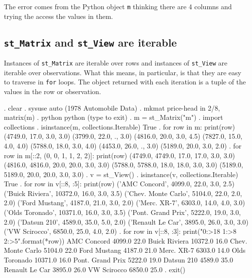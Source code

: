 \documentclass{article}
\begin{document}
The error comes from the Python object \texttt{m} thinking there are 4 columns and trying the access the values in them.



\subsection{\lstinline$st_Matrix$ and \lstinline$st_View$ are iterable} \label{iterable}

Instances of \lstinline{st_Matrix} are iterable over rows and instances of \lstinline{st_View} are iterable over observations. What this means, in particular, is that they are easy to traverse in \lstinline{for} loops. The object returned with each iteration is a tuple of the values in the row or observation.

\begin{stlog}
{\smallskip}
. clear
{\smallskip}
. sysuse auto
(1978 Automobile Data)
{\smallskip}
. mkmat price-head in 2/8, matrix(m)
{\smallskip}
. python
 python (type {} to exit) 
. m = st_Matrix("m")
{\smallskip}
. import collections
{\smallskip}
. isinstance(m, collections.Iterable)
True
{\smallskip}
. for row in m: print(row)
(4749.0, 17.0, 3.0, 3.0)
(3799.0, 22.0, ., 3.0)
(4816.0, 20.0, 3.0, 4.5)
(7827.0, 15.0, 4.0, 4.0)
(5788.0, 18.0, 3.0, 4.0)
(4453.0, 26.0, ., 3.0)
(5189.0, 20.0, 3.0, 2.0)
{\smallskip}
. for row in m[::2, (0, 0, 1, 1, 2, 2)]: print(row)
(4749.0, 4749.0, 17.0, 17.0, 3.0, 3.0)
(4816.0, 4816.0, 20.0, 20.0, 3.0, 3.0)
(5788.0, 5788.0, 18.0, 18.0, 3.0, 3.0)
(5189.0, 5189.0, 20.0, 20.0, 3.0, 3.0)
{\smallskip}
. v = st_View()
{\smallskip}
. isinstance(v, collections.Iterable)
True
{\smallskip}
. for row in v[::8, :5]: print(row)
('AMC Concord', 4099.0, 22.0, 3.0, 2.5)
('Buick Riviera', 10372.0, 16.0, 3.0, 3.5)
('Chev. Monte Carlo', 5104.0, 22.0, 2.0, 2.0)
('Ford Mustang', 4187.0, 21.0, 3.0, 2.0)
('Merc. XR-7', 6303.0, 14.0, 4.0, 3.0)
('Olds Toronado', 10371.0, 16.0, 3.0, 3.5)
('Pont. Grand Prix', 5222.0, 19.0, 3.0, 2.0)
('Datsun 210', 4589.0, 35.0, 5.0, 2.0)
('Renault Le Car', 3895.0, 26.0, 3.0, 3.0)
('VW Scirocco', 6850.0, 25.0, 4.0, 2.0)
{\smallskip}
. for row in v[::8, :3]: print("{\lbr}0:>18{\rbr} {\lbr}1:>8{\rbr} {\lbr}2:>5{\rbr}".format(*row))
       AMC Concord   4099.0  22.0
     Buick Riviera  10372.0  16.0
 Chev. Monte Carlo   5104.0  22.0
      Ford Mustang   4187.0  21.0
        Merc. XR-7   6303.0  14.0
     Olds Toronado  10371.0  16.0
  Pont. Grand Prix   5222.0  19.0
        Datsun 210   4589.0  35.0
    Renault Le Car   3895.0  26.0
       VW Scirocco   6850.0  25.0
{\smallskip}
. exit()
\end{stlog}
\end{document}
